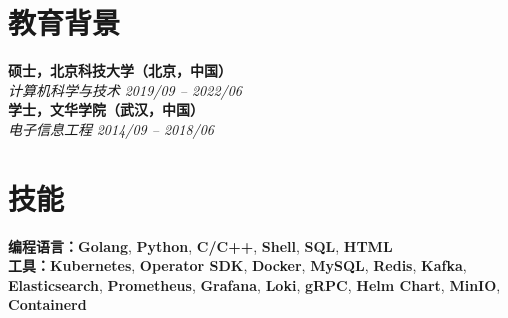 \documentclass[a4paper,10pt]{article}
\begin{document}
\begin{CJK}{UTF8}{gbsn}
\section*{教育背景}
\setlength{\parskip}{0em} %

\textbf{硕士，北京科技大学（北京，中国）} \\ 
\textit{计算机科学与技术} \hfill \textit{2019/09 -- 2022/06} \\

\textbf{学士，文华学院（武汉，中国）} \\ 
\textit{电子信息工程} \hfill \textit{2014/09 -- 2018/06}

\section*{技能}

\textbf{编程语言：}\textbf{Golang}, \textbf{Python}, \textbf{C/C++}, \textbf{Shell}, \textbf{SQL}, \textbf{HTML} \\ 
\textbf{工具：}\textbf{Kubernetes}, \textbf{Operator SDK}, \textbf{Docker}, \textbf{MySQL}, \textbf{Redis}, \textbf{Kafka}, \textbf{Elasticsearch}, \textbf{Prometheus}, \textbf{Grafana}, \textbf{Loki}, \textbf{gRPC}, \textbf{Helm Chart}, \textbf{MinIO}, \textbf{Containerd}

\end{CJK}
\end{document}
